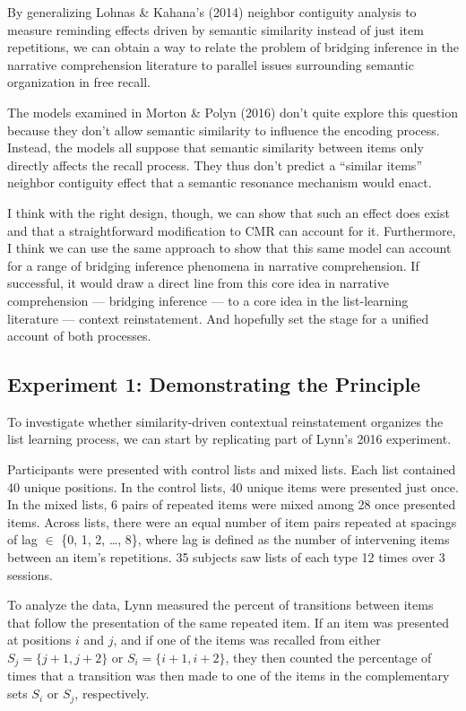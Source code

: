 \documentclass[
  english,
  11pt,
  letterpaper,
]{article}
\begin{document}
By generalizing Lohnas \& Kahana's (2014) neighbor contiguity analysis
to measure reminding effects driven by semantic similarity instead of
just item repetitions, we can obtain a way to relate the problem of
bridging inference in the narrative comprehension literature to parallel
issues surrounding semantic organization in free recall.

The models examined in Morton \& Polyn (2016) don't quite explore this
question because they don't allow semantic similarity to influence the
encoding process. Instead, the models all suppose that semantic
similarity between items only directly affects the recall process. They
thus don't predict a ``similar items'' neighbor contiguity effect that a
semantic resonance mechanism would enact.

I think with the right design, though, we can show that such an effect
does exist and that a straightforward modification to CMR can account
for it. Furthermore, I think we can use the same approach to show that
this same model can account for a range of bridging inference phenomena
in narrative comprehension. If successful, it would draw a direct line
from this core idea in narrative comprehension --- bridging inference
--- to a core idea in the list-learning literature --- context
reinstatement. And hopefully set the stage for a unified account of both
processes.

\subsection{Experiment 1: Demonstrating the
Principle}\label{experiment-1-demonstrating-the-principle}

To investigate whether similarity-driven contextual reinstatement
organizes the list learning process, we can start by replicating part of
Lynn's 2016 experiment.

Participants were presented with control lists and mixed lists. Each
list contained 40 unique positions. In the control lists, 40 unique
items were presented just once. In the mixed lists, 6 pairs of repeated
items were mixed among 28 once presented items. Across lists, there were
an equal number of item pairs repeated at spacings of lag \(\in\) \{0,
1, 2, \ldots, 8\}, where lag is defined as the number of intervening
items between an item's repetitions. 35 subjects saw lists of each type
12 times over 3 sessions.

To analyze the data, Lynn measured the percent of transitions between
items that follow the presentation of the same repeated item. If an item
was presented at positions \(i\) and \(j\), and if one of the items was
recalled from either \(S_j = \{j + 1, j + 2\}\) or
\(S_i = \{i + 1, i + 2\}\), they then counted the percentage of times
that a transition was then made to one of the items in the complementary
sets \(S_i\) or \(S_j\), respectively.
\end{document}
